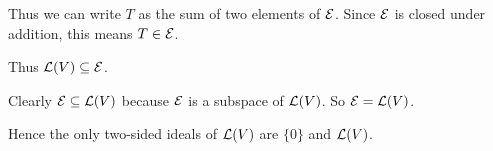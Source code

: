 \documentclass[a5paper]{article}
\begin{document}
    Thus we can write $T$ as the sum of two elements of $\mathcal{E}$.
    Since $\mathcal{E}$ is closed under addition, this means $T \in \mathcal{E}$.

    Thus $\mathcal{L}(V) \subseteq \mathcal{E}$.

    Clearly $\mathcal{E} \subseteq \mathcal{L}(V)$ because $\mathcal{E}$ is a subspace of $\mathcal{L}(V)$.
    So $\mathcal{E} = \mathcal{L}(V)$.

    Hence the only two-sided ideals of $\mathcal{L}(V)$ are $\{0\}$ and $\mathcal{L}(V)$.
\end{document}
